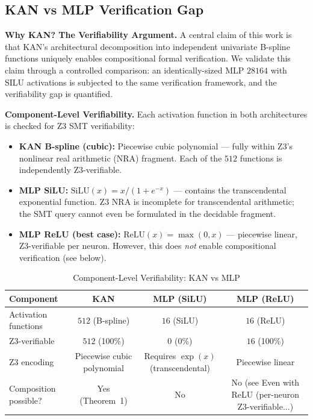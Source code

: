 \subsection{KAN vs MLP Verification Gap}
\label{sec:verify_gap}

\noindent\textbf{Why KAN? The Verifiability Argument.}
A central claim of this work is that KAN's architectural
decomposition into independent univariate B-spline
functions uniquely enables compositional formal
verification. We validate this claim through a
controlled comparison: an identically-sized MLP
$28$\to$16$\to$4$ with SILU 
activations is subjected to the same verification
framework, and the verifiability gap is quantified.

\textbf{Component-Level Verifiability.}
Each activation function in both architectures is
checked for Z3 SMT verifiability:
\begin{itemize}
  \item \textbf{KAN B-spline (cubic):} Piecewise cubic
  polynomial — fully within Z3's nonlinear real
  arithmetic (NRA) fragment. Each of the 
  $512$ functions is
  independently Z3-verifiable.
  \item \textbf{MLP SiLU:} $\text{SiLU}(x) = 
  x/(1+e^{-x})$ — contains the transcendental
  exponential function. Z3 NRA is incomplete for
  transcendental arithmetic; the SMT query cannot
  even be formulated in the decidable fragment.
  \item \textbf{MLP ReLU (best case):} $\text{ReLU}(x) =
  \max(0,x)$ — piecewise linear, Z3-verifiable per
  neuron. However, this does \textit{not} enable
  compositional verification (see below).
\end{itemize}

\begin{table}[ht]
\centering
\caption{Component-Level Verifiability: KAN vs MLP}
\label{tab:verify_gap_components}
\begin{tabular}{@{}lccc@{}}
\toprule
\textbf{Component} & \textbf{KAN} & \textbf{MLP (SiLU)} & \textbf{MLP (ReLU)} \\
\midrule
  Activation functions & $512$ (B-spline) & $16$ (SiLU) & $16$ (ReLU) \\
  Z3-verifiable & $512$ (100\%) & 0 (0\%) & $16$ (100\%) \\
  Z3 encoding & Piecewise cubic polynomial & Requires $\exp(x)$ (transcendental) & Piecewise linear \\
\midrule
  Composition possible? & Yes (Theorem~1) & No & No (see Even with ReLU (per-neuron Z3-verifiable...) \\
\bottomrule
\end{tabular}
\end{table}

